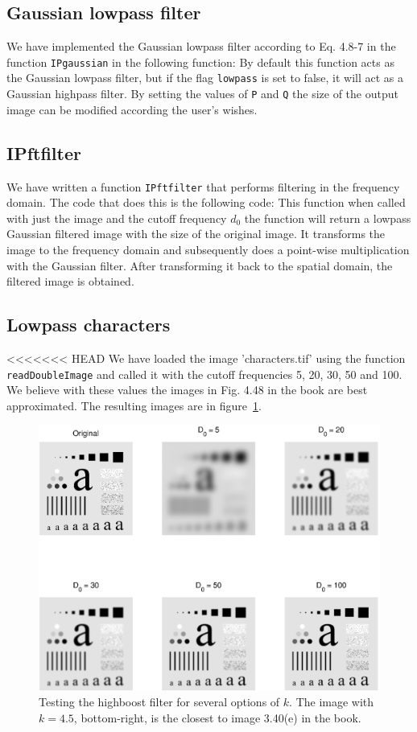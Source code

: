 \setcounter{subsection}{0}
\subsection{Gaussian lowpass filter}
We have implemented the Gaussian lowpass filter according to Eq. 4.8-7 in the function \texttt{IPgaussian} in the following function:
By default this function acts as the Gaussian lowpass filter, but if the flag \texttt{lowpass} is set to false, it will act as a Gaussian highpass filter. By setting the values of \texttt{P} and \texttt{Q} the size of the output image can be modified according the user's wishes.
\subsection{IPftfilter}
We have written a function \texttt{IPftfilter} that performs filtering in the frequency domain. The code that does this is the following code:
This function when called with just the image and the cutoff frequency $d_0$ the function will return a lowpass Gaussian filtered image with the size of the original image. It transforms the image to the frequency domain and subsequently does a point-wise multiplication with the Gaussian filter. After transforming it back to the spatial domain, the filtered image is obtained.
\subsection{Lowpass characters}
<<<<<<< HEAD
We have loaded the image 'characters.tif' using the function \texttt{readDoubleImage} and called it with the cutoff frequencies 5, 20, 30, 50 and 100. We believe with these values the images in Fig. 4.48 in the book are best approximated. The resulting images are in figure~\ref{fig:lowChars}.
\begin{figure}[ht]
 \centering
 \includegraphics{characters_low_pass.eps}
 \caption{Testing the highboost filter for several options of $k$. The image with $k = 4.5$, bottom-right, is the closest to image 3.40(e) in the book.}
 \label{fig:lowChars}
\end{figure}
